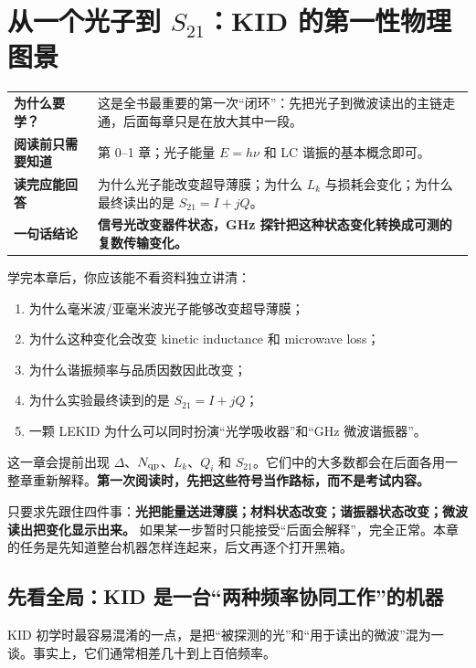 \documentclass[11pt,a4paper,openany]{ctexrep}
\newcommand{\chapterguide}[4]{%
\begin{tcolorbox}[
  enhanced,
  breakable,
  colback=KidGray!45,
  colframe=KidBlue!65,
  boxrule=0.8pt,
  arc=2mm,
  title=本章导航,
  fonttitle=\bfseries,
  before skip=0.7em,
  after skip=1.0em]
\renewcommand{\arraystretch}{1.18}
\noindent\begin{tabularx}{\textwidth}{>{\bfseries\color{KidBlue}}p{3.0cm} X}
为什么要学？ & #1 \\
阅读前只需要知道 & #2 \\
读完应能回答 & #3 \\
一句话结论 & \textbf{#4} \\
\end{tabularx}
\end{tcolorbox}%
}
\newcommand{\Stwentyone}{S_{21}}
\begin{document}
\chapter[从一个光子到 S21：KID 的第一性物理图景]{从一个光子到 $S_{21}$：KID 的第一性物理图景}
\chapterguide
{这是全书最重要的第一次“闭环”：先把光子到微波读出的主链走通，后面每章只是在放大其中一段。}
{第 0--1 章；光子能量 $E=h\nu$ 和 LC 谐振的基本概念即可。}
{为什么光子能改变超导薄膜；为什么 $L_k$ 与损耗会变化；为什么最终读出的是 $S_{21}=I+jQ$。}
{信号光改变器件状态，GHz 探针把这种状态变化转换成可测的复数传输变化。}

\begin{goalbox}
学完本章后，你应该能不看资料独立讲清：
\begin{enumerate}
  \item 为什么毫米波/亚毫米波光子能够改变超导薄膜；
  \item 为什么这种变化会改变 kinetic inductance 和 microwave loss；
  \item 为什么谐振频率与品质因数因此改变；
  \item 为什么实验最终读到的是 $\Stwentyone=I+jQ$；
  \item 一颗 LEKID 为什么可以同时扮演“光学吸收器”和“GHz 微波谐振器”。
\end{enumerate}
\end{goalbox}

\begin{tcolorbox}[colback=KidGold!10,colframe=KidGold!75!black,boxrule=0.7pt,arc=2mm,title=第一次读这一章：先看地图，不要试图当场学完所有理论,fonttitle=\bfseries]
这一章会提前出现 $\Delta$、$N_{\rm qp}$、$L_k$、$Q_i$ 和 $S_{21}$。它们中的大多数都会在后面各用一整章重新解释。\textbf{第一次阅读时，先把这些符号当作路标，而不是考试内容。}

只要求先跟住四件事：\textbf{光把能量送进薄膜；材料状态改变；谐振器状态改变；微波读出把变化显示出来。} 如果某一步暂时只能接受“后面会解释”，完全正常。本章的任务是先知道整台机器怎样连起来，后文再逐个打开黑箱。
\end{tcolorbox}

\section{先看全局：KID 是一台“两种频率协同工作”的机器}
KID 初学时最容易混淆的一点，是把“被探测的光”和“用于读出的微波”混为一谈。事实上，它们通常相差几十到上百倍频率。
\end{document}
